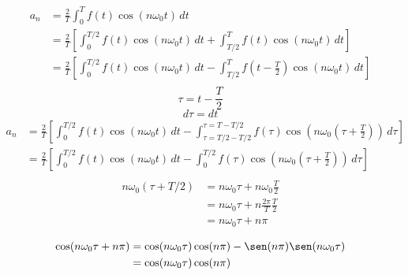 \begin{equation*}
\begin{split}
    a_n
        &=\frac{2}{T}\int_0^T f(t)\cos(n\omega_0 t)\,dt\\
        &=\frac{2}{T}\left[
            \int_0^{T/2} f(t)\cos(n\omega_0 t)\,dt+
            \int_{T/2}^T f(t)\cos(n\omega_0 t)\,dt
        \right]\\
        &=\frac{2}{T}\left[
            \int_0^{T/2} f(t)\cos(n\omega_0 t)\,dt-
            \int_{T/2}^T f(t-\frac{T}{2})\cos(n\omega_0 t)\,dt
        \right]\\
\end{split}
\end{equation*}
\begin{equation*}
    \tau=t-\frac{T}{2}
\end{equation*}
\begin{equation*}
    d\tau=dt
\end{equation*}
\begin{equation*}
\begin{split}
    a_n
        &=\frac{2}{T}\left[
            \int_0^{T/2} f(t)\cos(n\omega_0 t)\,dt-
            \int_{\tau=T/2-T/2}^{\tau=T-T/2}
                f(\tau)\cos(n\omega_0(\tau+\frac{T}{2}))\,d\tau
        \right]\\
        &=\frac{2}{T}\left[
            \int_0^{T/2} f(t)\cos(n\omega_0 t)\,dt-
            \int_0^{T/2} f(\tau)\cos(n\omega_0(\tau+\frac{T}{2}))\,d\tau
        \right]\\
\end{split}
\end{equation*}
\begin{equation*}
\begin{split}
    n\omega_0(\tau+T/2)
        &=n\omega_0\tau+n\omega_0\frac{T}{2}\\
        &=n\omega_0\tau+n\frac{2\pi}{T}\frac{T}{2}\\
        &=n\omega_0\tau+n\pi\\
\end{split}
\end{equation*}
\begin{equation*}
\begin{split}
    \cos(n\omega_0\tau+n\pi)
        &=\cos(n\omega_0\tau)\cos(n\pi)-\sen(n\pi)\sen(n\omega_0\tau)\\
        &=\cos(n\omega_0\tau)\cos(n\pi)\\
\end{split}
\end{equation*}
